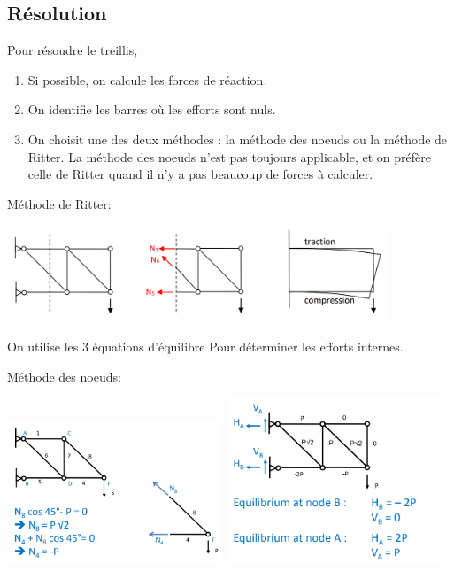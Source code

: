 \documentclass[a4paper]{article}
\begin{document}
\subsection{Résolution}





Pour résoudre le treillis,
\begin{enumerate}

    \item Si possible, on calcule les forces de réaction.
    \item On identifie les barres où les efforts sont nuls.
    \item On choisit une des deux méthodes : la méthode des noeuds ou la méthode de Ritter. La méthode des noeuds n'est pas toujours applicable, et on préfère celle de Ritter quand il n'y a pas beaucoup de forces à calculer.

\end{enumerate}

Méthode de Ritter:

\begin{center} \includegraphics[width=0.85\textwidth]{images/Treillis03.PNG} \end{center}

On utilise les 3 équations d'équilibre Pour déterminer les efforts internes.

Méthode des noeuds:

\begin{center} \includegraphics[width=0.48\textwidth]{images/Treillis04.PNG} \includegraphics[width=0.48\textwidth]{images/Treillis05.PNG} \end{center}
\end{document}
